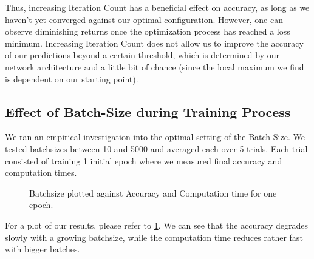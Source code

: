 \documentclass{article}
\begin{document}
Thus, increasing Iteration Count has a beneficial effect on accuracy, as long as we haven't yet converged against our optimal configuration. However, one can observe diminishing returns once the optimization process has reached a loss minimum. Increasing Iteration Count does not allow us to improve the accuracy of our predictions beyond a certain threshold, which is determined by our network architecture and a little bit of chance (since the local maximum we find is dependent on our starting point).

\subsection{Effect of Batch-Size during Training Process}
We ran an empirical investigation into the optimal setting of the Batch-Size. We tested batchsizes between 10 and 5000 and averaged each over 5 trials. Each trial consisted of training 1 initial epoch where we measured final accuracy and computation times.

\begin{figure}[h]
\centering
{}
\caption{Batchsize plotted against Accuracy and Computation time for one epoch.}\label{batchsizes}
\end{figure}

For a plot of our results, please refer to \ref{batchsizes}.
We can see that the accuracy degrades slowly with a growing batchsize, while the computation time reduces rather fast with bigger batches.
\end{document}
